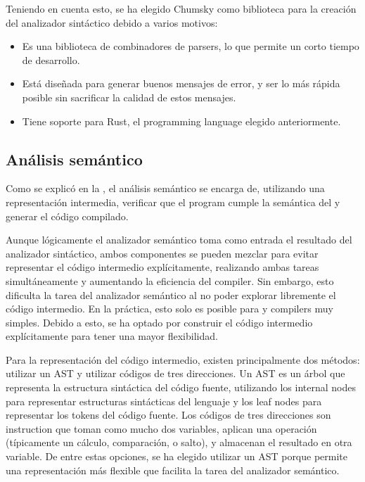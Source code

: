 Teniendo en cuenta esto, se ha elegido Chumsky como biblioteca para la creación
del analizador sintáctico debido a varios motivos:

\begin{itemize}
    \item Es una biblioteca de combinadores de \glspl{parser}, lo que permite un
    corto tiempo de desarrollo.
    \item Está diseñada para generar buenos mensajes de error, y ser lo más
    rápida posible sin sacrificar la calidad de estos mensajes.
    \item Tiene soporte para Rust, el \gls{programming language} elegido
    anteriormente.
\end{itemize}

\subsection{Análisis semántico}\label{subsec:compiler}

Como se explicó en la , el análisis semántico se
encarga de, utilizando una representación intermedia, verificar que el
\gls{program} cumple la semántica del  y
generar el código compilado.

Aunque lógicamente el analizador semántico toma como entrada el resultado del
analizador sintáctico, ambos componentes se pueden mezclar para evitar
representar el código intermedio explícitamente, realizando ambas tareas
simultáneamente y aumentando la eficiencia del \gls{compiler}. Sin embargo, esto
dificulta la tarea del analizador semántico al no poder explorar libremente el
código intermedio. En la práctica, esto solo es posible para
 y
\glspl{compiler} muy simples. Debido a esto, se ha optado por construir el
código intermedio explícitamente para tener una mayor flexibilidad.
\parencite{compiler-design}

Para la representación del código intermedio, existen principalmente dos
métodos: utilizar un \gls{AST} y utilizar códigos de tres direcciones. Un
\gls{AST} es un árbol que representa la estructura sintáctica del código fuente,
utilizando los \glspl{internal node} para representar estructuras sintácticas
del lenguaje y los \glspl{leaf node} para representar los \glspl{token} del
código fuente. Los códigos de tres direcciones son \gls{instruction} que toman
como mucho dos variables, aplican una operación (típicamente un cálculo,
comparación, o salto), y almacenan el resultado en otra variable. De entre estas
opciones, se ha elegido utilizar un \gls{AST} porque permite una representación
más flexible que facilita la tarea del analizador semántico.
\parencite{dragon-book}

